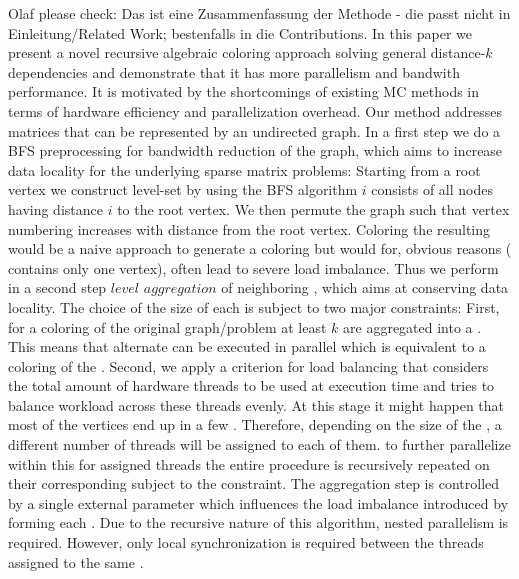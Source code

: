 
{\GW Olaf please check: Das ist eine Zusammenfassung der Methode - die passt nicht in Einleitung/Related Work; bestenfalls in die Contributions.}
In this paper we present a novel recursive algebraic coloring approach solving general distance-$k$ dependencies and demonstrate that it has more parallelism and bandwith performance. It is motivated by the shortcomings of existing \acrshort{MC} methods in terms of hardware efficiency and parallelization overhead. Our method addresses matrices that can be represented by an undirected graph. In a first step we do a \acrlong{BFS} preprocessing for bandwidth reduction of the graph, which aims to increase data locality for the underlying sparse matrix problems: Starting from a root vertex we construct level-set by using the \acrshort{BFS} algorithm \ie \level $i$ consists of all nodes having distance $i$ to the root vertex. We then permute the graph such that vertex numbering increases with distance from the root vertex. Coloring the resulting \levels would be a naive approach to generate a \DK coloring but would for, obvious reasons (\eg {} contains only one vertex), often lead to severe load imbalance. Thus we perform in a second step $level$ $aggregation$ of neighboring \levels, which aims at conserving data locality. The choice of the size of each \levelGroup is subject to two major constraints: First, for a \DK coloring of the original graph/problem at least $k$ \levels are aggregated into a \levelGroup. This means that alternate \levelGroups can be executed in parallel which is equivalent to a \DONE coloring of the \levelGroups. Second, we apply a criterion for load balancing that considers the total amount of hardware threads to be used at execution time and tries to balance workload across these threads evenly. At this stage it might happen that most of the vertices end up in a few \levelGroups. Therefore, depending on the size of the \levelGroups, a different number of threads will be assigned to each of them. \Inorder to further parallelize within this \levelGroup for assigned threads the entire procedure is recursively repeated on their corresponding \subgraphs subject to the \DK constraint. The aggregation step is controlled by a single external parameter which influences the load imbalance introduced by forming each \levelGroup. Due to the recursive nature of this algorithm, nested parallelism is required. However, only local synchronization is required between the threads assigned to the same \subgraph.


